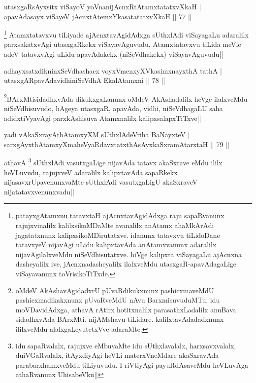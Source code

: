 \begin{shl}
utasxgaRsAyxsitx viSayoV yoVnanijAcnxRtAtamxtatatxvXkaH |\\
apavAdasayx viSayeV jAcnxtAtemxYkasatatatxvXkaH \hfill || 77 ||
\end{shl}

\begin{artha}
\footnote[2]{patayxgAtamxnu tatavxtaH ajAcnxtavAgidAdxga raju sapaRvanunx rajujxvinalilx kalilxsikoMDaMte avanalilx anAtamx ahaMkArAdi jagatatxnunx kalipxsikoMDirutatxve. idanunx tatavxvu tiLidoDane tatavxyeV nijavAgi uLidu kalipxtavAda anAtamxvanunx adaralilx nijavAgilalxveMdu niSeVdhisutatxve. hiVge kalipxta viSayagaLu ajAcnxna dasheyalilx ive, jAcnxnadasheyalilx ilalxveMdu utasxgaR-apavAdagaLige viSayavanunx toVrisikoTiTxde.} Atamxtatavxvu tiLiyade ajAcnxtavAgidAdxga sUthxlAdi viSayagaLu adaralilx parxsakatxvAgi utasxgaRkekx viSayavAguvudu, Atamxtatavxvu tiLida meVle adeV tatavxvAgi uLidu apavAdakekx (niSeVdhakekx) viSayavAguvudu||
\end{artha}

\begin{shl}
adhayxsatxdikninxSeVdhashacx voyxVmenxyXVkasimxnayxthA tathA |\\
utasxgARpavAdavidhiniSeVdhA EkalAtamxni \hfill || 78 ||
\end{shl}

\begin{artha}%
\footnote[1]{oMdeV AkAshavAgidadxrU pUvaRdikukxnunx pashicxmaveMdU pashicxmadikakxnunx pUvaRveMdU nAvu BarxmisuvuduMTu. idu moVDavidAdxga, athavA rAtirx hotitxnalilx parasathxLadalilx anuBava sidadhxvAda BArxMti. nijAMshavu tiLidare. kalilxtavAdadadxnunx ililxveMdu alalxgaLeyutetxVve adaraMte.}BArxMtisidadhxvAda dikukxgaLanunx oMdeV AkAshadalilx heVge ilalxveMdu niSeVdhisuvudo, hAgeya utasxgaR, apavAda, vidhi, niSeVdhagaLU saha adidxtiVyavAgi parxkAshisuva Atamxnalilx kalipxsalapxTiTxve||
\end{artha}


\begin{shl}
yadi vA\s kaSxrayAthAtamxyXM sUthxlAdeVriha BaNayxteV |\\
sarxgAyxthAtamxyXmaheVyaRdavxtatxthA\s sAyxkaSxramAtarxtaH \hfill || 79 ||
\end{shl}

\begin{artha}
athavA \footnote[2]{idu sapaRvalalx, rajujxve eMbuvaMte idu sUthxlavalalx, harxsavxvalalx, duiVGaRvalalx, itAyxdiyAgi heVLi materxVneMdare akaSxravAda parabarxhamxveMdu tiLiyuvudu. I riVtiyAgi payuRdAsaveMdu heVLuvAga athaRvanunx UhisabeVku||} sUthxlAdi vasutxgaLige nijavAda tatavx akaSxrave eMdu ililx heVLuvudu, rajujxveV adaralilx kalipxtavAda sapaRkekx nijasavxrUpavenunxvaMte sUthxlAdi vasutxgaLigU akaSxraveV nijatatavxvenunxvadu||
\end{artha}

